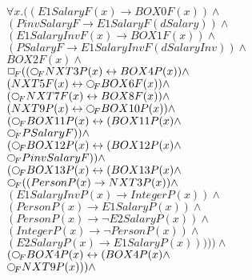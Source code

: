 \documentclass[a4paper,10pt]{article}
\begin{document}
 \newcommand{\nxt}{{\ensuremath\raisebox{0.25ex}{\text{\scriptsize$\bigcirc$}}}}
\newcommand{\Rdiamond}{\Diamond_{\!F}}
\newcommand{\Rbox}{\Box_{\!F}}
\newcommand{\Rnext}{\nxt_{\!F}}
\newcommand{\Ldiamond}{\Diamond_{\!P}}
\newcommand{\Lbox}{\Box_{\!P}}
\newcommand{\Lnext}{\nxt_{\!P}}
\newcommand{\SVdiamond}{\mathop{\ooalign{$\Diamond$ \cr \kern0.5ex
    \raisebox{0.35ex}{\scalebox{0.7}{$*$}}} \kern-0.9ex}}
\newcommand{\SVbox}{\mathop{\ooalign{$\Box$ \cr \kern0.42ex
    \raisebox{0.3ex}{\scalebox{0.7}{$*$}}} \kern-0.9ex}}


$ \forall x. ((E1SalaryF(x) \rightarrow BOX0F(x)) \land $ \\ 
 $ (PinvSalaryF \rightarrow E1SalaryF(dSalary)) \land $ \\ 
 $ (E1SalaryInvF(x) \rightarrow BOX1F(x)) \land $ \\ 
 $ (PSalaryF \rightarrow E1SalaryInvF(dSalaryInv)) \land $ \\ 
 $ BOX2F(x) \land $ \\ 
 $  \Rbox (( \Rnext NXT3P(x) \leftrightarrow BOX4P(x)) \land $ \\ 
 $ (NXT5F(x) \leftrightarrow  \Rnext BOX6F(x)) \land $ \\ 
 $ ( \Rnext NXT7F(x) \leftrightarrow BOX8F(x)) \land $ \\ 
 $ (NXT9P(x) \leftrightarrow  \Rnext BOX10P(x)) \land $ \\ 
 $ ( \Rnext BOX11P(x) \leftrightarrow (BOX11P(x) \land $ \\ 
 $  \Rnext PSalaryF)) \land $ \\ 
 $ ( \Rnext BOX12P(x) \leftrightarrow (BOX12P(x) \land $ \\ 
 $  \Rnext PinvSalaryF)) \land $ \\ 
 $ ( \Rnext BOX13P(x) \leftrightarrow (BOX13P(x) \land $ \\ 
 $  \Rnext ((PersonP(x) \rightarrow NXT3P(x)) \land $ \\ 
 $ (E1SalaryInvP(x) \rightarrow IntegerP(x)) \land $ \\ 
 $ (PersonP(x) \rightarrow E1SalaryP(x)) \land $ \\ 
 $ (PersonP(x) \rightarrow  \lnot E2SalaryP(x)) \land $ \\ 
 $ (IntegerP(x) \rightarrow  \lnot PersonP(x)) \land $ \\ 
 $ (E2SalaryP(x) \rightarrow E1SalaryP(x))))) \land $ \\ 
 $ ( \Rnext BOX4P(x) \leftrightarrow (BOX4P(x) \land $ \\ 
 $  \Rnext NXT9P(x))) \land $ \\ 
\end{document}
